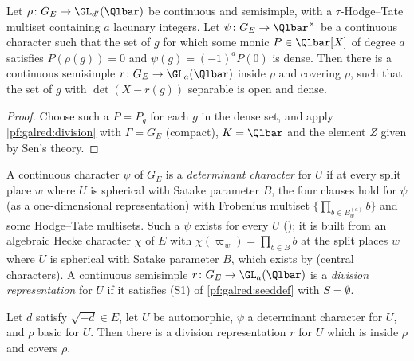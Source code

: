 \begin{lemma}\label{pf:galred:divset}
Let $\rho\colon G_E\to\GL_{d'}(\Qlbar)$ be continuous and semisimple, with a $\tau$-Hodge--Tate multiset containing $a$
lacunary integers. Let $\psi\colon G_E\to\Qlbar^\times$ be a continuous character such that the set of $g$ for which some
monic $P\in\Qlbar[X]$ of degree $a$ satisfies $P(\rho(g))=0$ and $\psi(g)=(-1)^aP(0)$ is dense. Then there is a continuous
semisimple $r\colon G_E\to\GL_a(\Qlbar)$ inside $\rho$ and covering $\rho$, such that the set of $g$ with $\det(X-r(g))$
separable is open and dense.
\end{lemma}

\begin{proof}
Choose such a $P=P_g$ for each $g$ in the dense set, and apply \cref{pf:galred:division} with $\Gamma=G_E$ (compact),
$K=\Qlbar$ and the element $Z$ given by Sen's theory.
\end{proof}

A continuous character $\psi$ of $G_E$ is a \emph{determinant character} for $U$ if at every split place $w$ where $U$ is
spherical with Satake parameter $B$, the four clauses hold for $\psi$ (as a one-dimensional representation) with
Frobenius multiset $\{\prod_{b\in B^{(a)}_w}b\}$ and some Hodge--Tate multisets. Such a $\psi$ exists for every $U$
(); it is built from an algebraic Hecke character $\chi$ of $E$ with
$\chi(\varpi_w)=\prod_{b\in B}b$ at the split places $w$ where $U$ is spherical with Satake parameter $B$, which exists by
 (central characters). A continuous semisimple $r\colon G_E\to\GL_a(\Qlbar)$ is a \emph{division
representation} for $U$ if it satisfies (S1) of \cref{pf:galred:seeddef} with $S=\emptyset$.

\begin{lemma}\label{pf:galred:divone}
Let $d$ satisfy $\sqrt{-d}\in E$, let $U$ be automorphic, $\psi$ a determinant character for $U$, and $\rho$ basic for $U$. Then
there is a division representation $r$ for $U$ which is inside $\rho$ and covers $\rho$.
\end{lemma}

